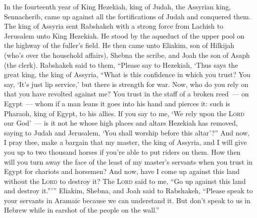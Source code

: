 
\begin{inparaenum}
     In the fourteenth year of King Hezekiah, king of Judah, the Assyrian king, Sennacherib, came up against all the fortifications of Judah and conquered them.%
     The king of Assyria sent Rabshakeh with a strong force from Lachish to Jerusalem unto King Hezekiah. He stood by the aqueduct of the upper pool on the highway of the fuller's field.%
     He then came unto Eliakim, son of Hilkijah (who's over the household affairs), Shebna the scribe, and Joah the son of Asaph (the clerk).%
     Rabshakeh said to them, ``Please say to Hezekiah, `Thus says the great king, the king of Assyria, ``What is this confidence in which you trust?%
     You say, `It's just lip service,' but there is strength for war. Now, who do you rely on that you have revolted against me?%
     You trust in the staff of a broken reed~--- on Egypt~--- whom if a man leans it goes into his hand and pierces it: such is Pharaoh, king of Egypt, to his allies.%
     If you say to me, `We rely upon the \textsc{Lord} our God'~--- is it not he whose high places and altars Hezekiah has removed, saying to Judah and Jerusalem, `You shall worship before this altar'?''%
     And now, I pray thee, make a bargain that my master, the king of Assyria, and I will give you up to two thousand horses if you're able to put riders on them.%
     How then will you turn away the face of the least of my master's servants when you trust in Egypt for chariots and horsemen?%
     And now, have I come up against this land without the \textsc{Lord} to destroy it? The \textsc{Lord} said to me, ``Go up against this land and destroy it.''\thinspace'\thinspace''%
     Eliakim, Shebna, and Joah said to Rabshakeh, ``Please speak to your servants in Aramaic because we can understand it. But don't speak to us in Hebrew while in earshot of the people on the wall.''%

\end{inparaenum}
